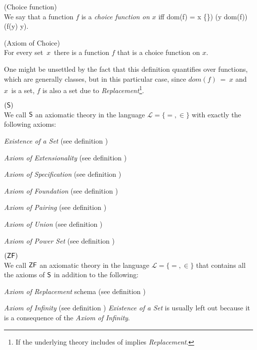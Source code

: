\begin{definition}{(Choice function)}\label{def:choice_function}\\
We say that a function $f$ is a \emph{choice function on $x$} iff
\beq
dom(f) = x \setminus \{\emptyset\}) \et (\forall y \in dom(f))(f(y) \in y)\mbox{.}
\eeq
\end{definition}


\begin{definition}{(Axiom of Choice)}\label{def:choice}\\
For every set~$x$~there is a function $f$ that is a choice function on $x$.
\end{definition}
One might be unsettled by the fact that this definition quantifies over functions, which are generally classes, but in this particular case, since $dom(f)~=~x$ and~$x$~is a set, $f$ is also a set due to \emph{Replacement}\footnote{If the underlying theory includes of implies \emph{Replacement}.}.

\newpage
\begin{definition}{$(\sf{S})$}\label{def:s}\\ %
We call $\sf{S}$ an axiomatic theory in the language $\mathscr{L} = \{=, \in\}$ with exactly the following axioms:
\bce[(i)]
\item \emph{Existence of a Set} (see definition )
\item \emph{Axiom of Extensionality} (see definition )
\item \emph{Axiom of Specification} (see definition )
\item \emph{Axiom of Foundation} (see definition )
\item \emph{Axiom of Pairing} (see definition )
\item \emph{Axiom of Union} (see definition )
\item \emph{Axiom of Power Set} (see definition )
\ece
\end{definition}

\begin{definition}{$(\sf{ZF})$}\label{def:zf}\\ %
We call $\sf{ZF}$ an axiomatic theory in the language $\mathscr{L} = \{=, \in\}$ that contains all the axioms of $\sf{S}$ in addition to the following:
\bce[(i)]
\item \emph{Axiom of Replacement} schema (see definition )
\item \emph{Axiom of Infinity} (see definition )
\ece
\emph{Existence of a Set} is usually left out because it is a consequence of the \emph{Axiom of Infinity}.
\end{definition}

